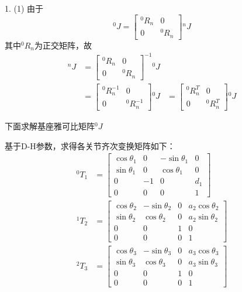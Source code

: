 \documentclass[UTF8, 13pt]{ctexart}
\begin{document}
1.
(1)
由于
\[
{}^0 J = \begin{bmatrix}
            {}^0 R_n & 0 \\
            0 & {}^0 R_n
        \end{bmatrix} {}^n J
\]
其中\({}^0 R_n\)为正交矩阵，故
\[
\begin{aligned}
    {}^n J &= \begin{bmatrix}
            {}^0 R_n & 0 \\
            0 & {}^0 R_n
            \end{bmatrix}^{-1} 
            {}^0 J \\
    &= \begin{bmatrix}
            {}^0 R_n^{-1} & 0 \\
            0 & {}^0 R_n^{-1}
        \end{bmatrix} {}^0 J
    &= \begin{bmatrix}
            {}^0 R_n^T & 0 \\
            0 & {}^0 R_n^T
        \end{bmatrix} {}^0 J
\end{aligned}
\]

下面求解基座雅可比矩阵\({}^0J\)

基于D-H参数，求得各关节齐次变换矩阵如下：
\[
\begin{aligned}
    {}^0 T_1 &= \begin{bmatrix}
                    \cos\theta_1 & 0 & -\sin\theta_1 & 0 \\
                    \sin\theta_1 & 0 & \cos\theta_1 & 0 \\
                    0 & -1 & 0 & d_1 \\
                    0 & 0 & 0 & 1
                \end{bmatrix} \\
    {}^1 T_2 &= \begin{bmatrix}
                    \cos\theta_2 & -\sin\theta_2 & 0 & a_2\cos\theta_2 \\
                    \sin\theta_2 & \cos\theta_2 & 0 & a_2\sin\theta_2 \\
                    0 & 0 & 1 & 0 \\
                    0 & 0 & 0 & 1
                \end{bmatrix} \\
    {}^2 T_3 &= \begin{bmatrix}
                   \cos\theta_3 & -\sin\theta_3 & 0 & a_3\cos\theta_3 \\
                   \sin\theta_3 & \cos\theta_3 & 0 & a_3\sin\theta_3 \\
                   0 & 0 & 1 & 0 \\
                   0 & 0 & 0 & 1
               \end{bmatrix} \\
\end{aligned}
\]
\end{document}
